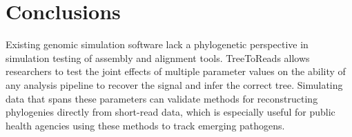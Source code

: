 \section*{Conclusions}
Existing genomic simulation software lack a phylogenetic perspective in simulation testing of assembly and alignment tools. 
TreeToReads allows researchers to test the joint effects of multiple parameter values
on the ability of any analysis pipeline to recover the signal and infer the correct tree. 
Simulating data that spans these parameters can validate methods for reconstructing phylogenies directly from short-read data, 
which is especially useful for public health agencies using these methods to track emerging pathogens. 




